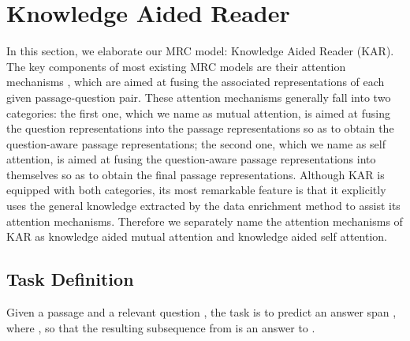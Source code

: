 \documentclass[11pt,a4paper]{article}
\begin{document}
\section{Knowledge Aided Reader}
In this section, we elaborate our MRC model: Knowledge Aided Reader (KAR). The key components of most existing MRC models are their attention mechanisms \cite{bahdanaudzmitry:2014}, which are aimed at fusing the associated representations of each given passage-question pair. These attention mechanisms generally fall into two categories: the first one, which we name as mutual attention, is aimed at fusing the question representations into the passage representations so as to obtain the question-aware passage representations; the second one, which we name as self attention, is aimed at fusing the question-aware passage representations into themselves so as to obtain the final passage representations. Although KAR is equipped with both categories, its most remarkable feature is that it explicitly uses the general knowledge extracted by the data enrichment method to assist its attention mechanisms. Therefore we separately name the attention mechanisms of KAR as knowledge aided mutual attention and knowledge aided self attention.

\subsection{Task Definition}
Given a passage  and a relevant question , the task is to predict an answer span , where , so that the resulting subsequence  from  is an answer to .
\end{document}
